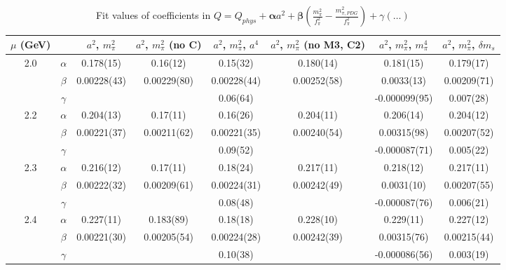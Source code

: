 \documentclass[12pt]{extarticle}
\begin{document}
\begin{table}[h!]
\begin{center}
\begin{tabular}{|c c|c|c|c|c|c|c|}
\hline
$\mu$ (GeV) &  & $a^2$, $m_\pi^2$& $a^2$, $m_\pi^2$ (no C)& $a^2$, $m_\pi^2$, $a^4$& $a^2$, $m_\pi^2$ (no M3, C2)& $a^2$, $m_\pi^2$, $m_\pi^4$& $a^2$, $m_\pi^2$, $\delta m_s$\\
\hline
\multirow{3}{0.5in}{2.0} & $\alpha$ & 0.178(15)& 0.16(12)& 0.15(32)& 0.180(14)& 0.181(15)& 0.179(17)\\
 & $\beta$ & 0.00228(43)& 0.00229(80)& 0.00228(44)& 0.00252(58)& 0.0033(13)& 0.00209(71)\\
 & $\gamma$ &  &  & 0.06(64)&  & -0.000099(95)& 0.007(28)\\
\hline
\multirow{3}{0.5in}{2.2} & $\alpha$ & 0.204(13)& 0.17(11)& 0.16(26)& 0.204(11)& 0.206(14)& 0.204(12)\\
 & $\beta$ & 0.00221(37)& 0.00211(62)& 0.00221(35)& 0.00240(54)& 0.00315(98)& 0.00207(52)\\
 & $\gamma$ &  &  & 0.09(52)&  & -0.000087(71)& 0.005(22)\\
\hline
\multirow{3}{0.5in}{2.3} & $\alpha$ & 0.216(12)& 0.17(11)& 0.18(24)& 0.217(11)& 0.218(12)& 0.217(11)\\
 & $\beta$ & 0.00222(32)& 0.00209(61)& 0.00224(31)& 0.00242(49)& 0.0031(10)& 0.00207(55)\\
 & $\gamma$ &  &  & 0.08(48)&  & -0.000087(76)& 0.006(21)\\
\hline
\multirow{3}{0.5in}{2.4} & $\alpha$ & 0.227(11)& 0.183(89)& 0.18(18)& 0.228(10)& 0.229(11)& 0.227(12)\\
 & $\beta$ & 0.00221(30)& 0.00205(54)& 0.00224(28)& 0.00242(39)& 0.00315(76)& 0.00215(44)\\
 & $\gamma$ &  &  & 0.10(38)&  & -0.000086(56)& 0.003(19)\\
\hline
\end{tabular}
\caption{Fit values of coefficients in $Q = Q_{phys} + \mathbf{\alpha} a^2 + \mathbf{\beta}\left(\frac{m_\pi^2}{f_\pi^2}-\frac{m_{\pi,PDG}^2}{f_\pi^2}\right) + \gamma(\ldots)$}
\end{center}
\end{table}






\end{document}
